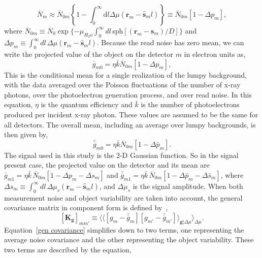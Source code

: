 %
\begin{equation}
\label{xrayeqnapprox}
\overline{N}_m \approx \overline{N}_{0m} \left\{1-\int_{0}^{\infty} \mathrm{d}l \Delta\mu(\mathbf{r}_m - \mathbf{\hat{s}}_ml)\right\} \equiv \overline{N}_{0m}[1-\Delta p_m],
\end{equation}
%
where $\overline{N}_{0m} \equiv \overline{N}_0 \exp\{-\mu_{H_2o} \int_0^{\infty} dl\,$sph$[(\mathbf{r}_m-\mathbf{s}_m )/D] \} $ and $\Delta p_m \equiv \int_0^{\infty} dl \, \Delta \mu(\mathbf{r}_m-\mathbf{\hat{s}}_m l)$.  Because the read noise has zero mean, we can write the projected value of the object on the detector $m$ in electron units as,
%
\begin{equation}
\label{gbar}
\bar{g}_{m0} = \eta \bar{k}\overline{N}_{0m}[1-\Delta p_m],
\end{equation}
% 
This is the conditional mean for a single realization of the lumpy background, with the data averaged over the Poisson fluctuations of the number of x-ray photons, over the photoelectron generation process, and over read noise.  In this equation, $\eta$ is the quantum efficiency and $\bar{k}$ is the number of photoelectrons produced per incident x-ray photon.  These values are assumed to be the same for all detectors.  The overall mean, including an average over lumpy backgrounds, is then given by,
%
\begin{equation}
\label{gdoublebar}
\bar{\bar{g}}_{m0} = \eta\bar{k}\overline{N}_{0m}[1-\Delta \bar{p}_m].
\end{equation}
%
The signal used in this study is the 2-D Gaussian function.  So in the signal present case, the projected value on the detector and its mean are $\bar{g}_{m1} = \eta \bar{k}\, \overline{N}_{0m}[1 - \Delta p_m - \Delta s_m]$ and $ \bar{\bar{g}}_{m1} = \eta\bar{k}\, \overline{N}_{0m}[1 - \Delta \bar{p}_m - \Delta\bar{s}_m]$,  where $\Delta s_m \equiv \int_0^{\infty}dl \, \Delta \mu_s (\mathbf{r}_m - \mathbf{\hat{s}}_m l)$, and $\Delta\mu_s$ is the signal amplitude.
When both measurement noise and object variability are taken into account, the general covariance matrix in component form is defined by~\citep{Barrett2004},
%
\begin{equation}
\label{gen covariance}
[\mathbf{K_g}]_{mm'} \equiv \langle \langle[g_m-\bar{\bar{g}}_m][g_{m'}-\bar{\bar{g}}_{m'}]\rangle_{\mathbf{g}|\Delta\mu} \rangle_{\Delta\mu}.
\end{equation}
%
Equation~\ref{gen covariance} simplifies down to two terms, one representing the average noise covariance and the other representing the object variability.  These two terms are described by the equation,

